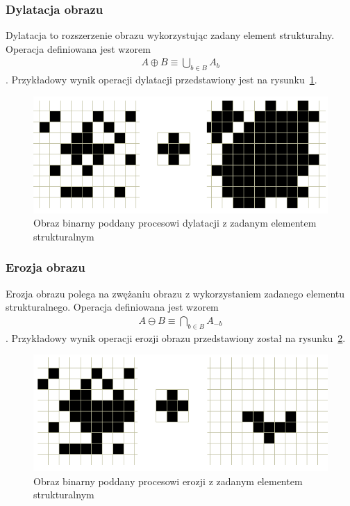\subsubsection{Dylatacja obrazu}
Dylatacja to rozszerzenie obrazu wykorzystując zadany element strukturalny. Operacja definiowana jest wzorem
\begin{gather*}
  A \oplus B \equiv \bigcup \limits_{b \in B} A_b
\end{gather*}.
Przykładowy wynik operacji dylatacji przedstawiony jest na rysunku~\ref{fig:dilate}.
\begin{figure}
  \centering
  \includegraphics[width=15cm]{img/dilate}
  \caption{Obraz binarny poddany procesowi dylatacji z zadanym elementem strukturalnym}
  \label{fig:dilate}
\end{figure}
\subsubsection{Erozja obrazu} 
Erozja obrazu polega na zwężaniu obrazu z wykorzystaniem zadanego elementu strukturalnego. Operacja definiowana jest wzorem
\begin{gather*}
  A \ominus B \equiv \bigcap \limits_{b \in B} A_{-b}
\end{gather*}.
Przykładowy wynik operacji erozji obrazu przedstawiony został na rysunku~\ref{fig:erode}.
\begin{figure}
  \centering
  \includegraphics[width=15cm]{img/erode}
  \caption{Obraz binarny poddany procesowi erozji z zadanym elementem strukturalnym}
  \label{fig:erode}
\end{figure}
